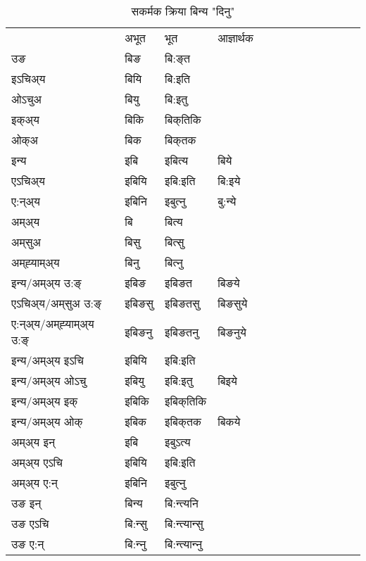 \begin{table}[H]
\centering
\caption{\label{i.vt} सकर्मक क्रिया  बिन्य  "दिनु"  }
\begin{tabular}{l|l|l|l|l|l|l|l|l|l|l|l|l}  \toprule
&अभूत & भूत & आज्ञार्थक \\ 
उङ &बिङ &बि:ङ्‌त \\ 
इऽचिअ्य &बियि &बि:इति   \\ 
ओऽचुअ &बियु &बि:इतु   \\ 
इक्अ्य &बिकि &बिक्‌तिकि   \\ 
ओक्अ &बिक &बिक्‌तक   \\ 
इन्य & इबि & इबित्य &बिये  \\ 
एऽचिअ्य & इबियि & इबि:इति &बि:इये    \\ 
ए:न्अ्य & इबिनि  & इबुत्‍नु &बु:न्ये  \\ 
अम्अ्य & बि & बित्य   \\ 
अम्‌सुअ & बिसु & बित्सु     \\ 
अम्‌ह्‍याम्अ्य & बिनु  & बित्‍नु \\ 
\midrule
इन्य/अम्अ्य उ:ङ्‌&इबिङ &इबिङत &बिङये \\ 
एऽचिअ्य/अम्‌सुअ उ:ङ्‌ &इबिङसु &इबिङतसु &बिङसुये \\ 
ए:न्अ्य/अम्‌ह्‍याम्अ्य उ:ङ्‌ &इबिङनु &इबिङतनु &बिङनुये \\ 
इन्य/अम्अ्य इऽचि &इबियि &इबि:इति    \\ 
इन्य/अम्अ्य ओऽचु &इबियु &इबि:इतु  &बिइये  \\ 
इन्य/अम्अ्य इक् &इबिकि &इबिक्‌तिकि   \\ 
इन्य/अम्अ्य ओक् &इबिक &इबिक्‌तक  &बिकये  \\ 
अम्अ्य इन् & इबि & इबुऽत्य   \\ 
अम्अ्य एऽचि & इबियि & इबि:इति     \\ 
अम्अ्य ए:न् & इबिनि  & इबुत्‍नु  \\ 
\midrule
उङ इन् & बिन्य  & बि:न्त्यनि  \\ 
उङ एऽचि & बि:न्सु  & बि:न्त्यान्सु   \\ 
उङ ए:न्& बि:न्‍नु  & बि:न्त्यान्‍नु   \\ 
\bottomrule
\end{tabular}
\end{table}


